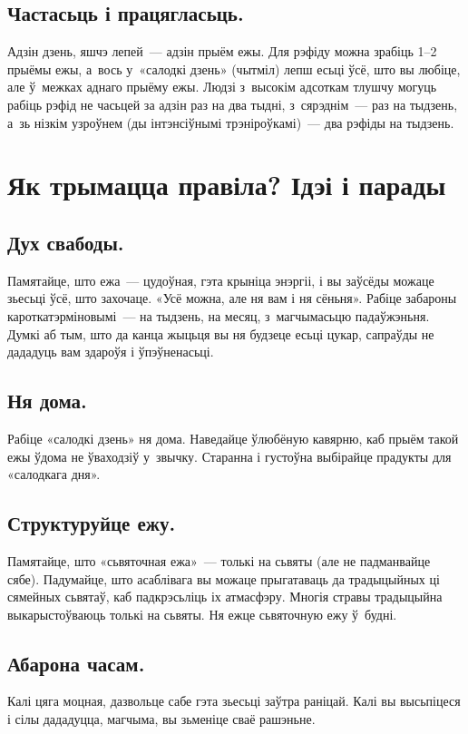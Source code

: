 \subsection{Частасьць і працягласьць.}
Адзін дзень, яшчэ лепей~--- адзін прыём ежы. Для рэфіду можна зрабіць 1--2 прыёмы ежы, а~вось у~«салодкі дзень» (чытміл) лепш есьці ўсё, што вы любіце, але ў~межках аднаго прыёму ежы. Людзі з~высокім адсоткам тлушчу могуць рабіць рэфід не часьцей за адзін раз на два тыдні, з~сярэднім~--- раз на тыдзень, а~зь нізкім узроўнем (ды інтэнсіўнымі трэніроўкамі)~--- два рэфіды на тыдзень.

\section{Як трымацца правіла? Ідэі і парады}

\subsection{Дух свабоды.}
Памятайце, што ежа~--- цудоўная, гэта крыніца энэргіі, і вы заўсёды можаце зьесьці ўсё, што захочаце. «Усё можна, але ня вам і ня сёньня». Рабіце забароны кароткатэрміновымі~--- на тыдзень, на месяц, з~магчымасьцю падаўжэньня. Думкі аб тым, што да канца жыцьця вы ня будзеце есьці цукар, сапраўды не дададуць вам здароўя і ўпэўненасьці.

\subsection{Ня дома.}
Рабіце «салодкі дзень» ня дома. Наведайце ўлюбёную кавярню, каб прыём такой ежы ўдома не ўваходзіў у~звычку. Старанна і густоўна выбірайце прадукты для «салодкага дня».

\subsection{Структуруйце ежу.}
Памятайце, што «сьвяточная ежа»~--- толькі на сьвяты (але не падманвайце сябе). Падумайце, што асаблівага вы можаце прыгатаваць да традыцыйных ці сямейных сьвятаў, каб падкрэсьліць іх атмасфэру. Многія стравы традыцыйна выкарыстоўваюць толькі на сьвяты. Ня ежце сьвяточную ежу ў~будні.

\subsection{Абарона часам.}
Калі цяга моцная, дазвольце сабе гэта зьесьці заўтра раніцай. Калі вы высьпіцеся і сілы дададуцца, магчыма, вы зьменіце сваё рашэньне.

